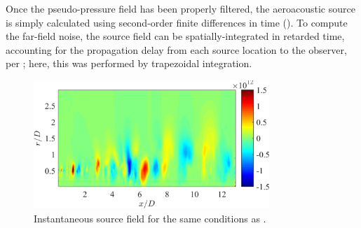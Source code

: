 Once the pseudo-pressure field has been properly filtered, the aeroacoustic source is simply calculated using second-order finite differences in time ().
To compute the far-field noise, the source field can be spatially-integrated in retarded time, accounting for the propagation delay from each source location to the observer, per ; here, this was performed by trapezoidal integration. 
\begin{figure}
	\centering
	\includegraphics[width = 3.5in]{Figures/ch5_valid_Inst_source.png}
	\caption{Instantaneous source field for the same conditions as .}
	\label{fig:valid_source}
\end{figure}

